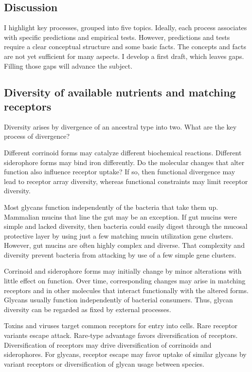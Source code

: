 \documentclass[\mydocfontsize]{article}
\begin{document}
\begin{multicols}{2}
\section{Discussion}

I highlight key processes, grouped into five topics. Ideally, each process associates with specific predictions and empirical tests. However, predictions and tests require a clear conceptual structure and some basic facts. The concepts and facts are not yet sufficient for many aspects. I develop a first draft, which leaves gaps. Filling those gaps will advance the subject.

\subsection{Diversity of available nutrients and matching receptors} 

Diversity arises by divergence of an ancestral type into two. What are the key process of divergence? 

 Different corrinoid forms may catalyze different biochemical reactions. Different siderophore forms may bind iron differently. Do the molecular changes that alter function also influence receptor uptake? If so, then functional divergence may lead to receptor array diversity, whereas functional constraints may limit receptor diversity.

Most glycans function independently of the bacteria that take them up. Mammalian mucins that line the gut may be an exception. If gut mucins were simple and lacked diversity, then bacteria could easily digest through the mucosal protective layer by using just a few matching mucin utilization gene clusters. However, gut mucins are often highly complex and diverse. That complexity and diversity prevent bacteria from attacking by use of a few simple gene clusters.

 Corrinoid and siderophore forms may initially change by minor alterations with little effect on function. Over time, corresponding changes may arise in matching receptors and in other molecules that interact functionally with the altered forms. Glycans usually function independently of bacterial consumers.  Thus, glycan diversity can be regarded as fixed by external processes. 

 Toxins and viruses target common receptors for entry into cells. Rare receptor variants escape attack. Rare-type advantage favors diversification of receptors. Diversification of receptors may drive diversification of corrinoids and siderophores. For glycans, receptor escape may favor uptake of similar glycans by variant receptors or diversification of glycan usage between species. 


\end{multicols}
\end{document}
